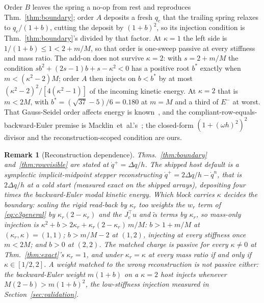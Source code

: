 \documentclass[sigconf,screen,review,anonymous]{acmart}
\newcommand{\Rr}{w_{r}}
\newcommand{\oh}{\omega h}
\theoremstyle{acmdefinition}
\newtheorem{remark}{Remark}
\begin{document}
Order $B$ leaves the spring a no-op from rest and reproduces
Thm.~\ref{thm:boundary}; order $A$ deposits a fresh $q_c$ that the trailing
spring relaxes to $q_c/(1+b)$, cutting the deposit by $(1+b)^2$, so its
injection condition is Thm.~\ref{thm:boundary}'s divided by that factor. At
$\kappa = 1$ the left side is $1/(1+b) \le 1 < 2 + m/M$, so that
order is one-sweep passive at every stiffness and mass ratio. The add-on does
not survive $\kappa = 2$: with $s = 2 + m/M$ the condition
$s b^2 + (2s - 1) b + s - \kappa^2 < 0$ has a positive root $b^{*}$
exactly when $m < (\kappa^2 - 2)M$; order $A$ then
injects on $b < b^{*}$ by at most $(\kappa^2 - 2)^2/[4(\kappa^2 - 1)]$ of the
incoming kinetic energy. At $\kappa = 2$ that is $m < 2M$, with
$b^{*} = (\sqrt{37} - 5)/6 = 0.180$ at $m = M$ and a third of $E^{-}$ at worst.
That Gauss-Seidel order affects energy is
known~\citep{arnold2010stability,cetinaslan2019energyaware}, and the
compliant-row-equals-backward-Euler premise is
Macklin~et~al.'s~\citep{macklin2016xpbd}; the closed-form $(1 + (\oh)^2)^2$
divisor and the reconstruction-scoped condition are ours.

\begin{remark}[Reconstruction dependence]
\label{rmk:recon}
Thms.~\ref{thm:boundary} and~\ref{thm:rowvisible} are stated at
$\dot q^{+} = \Delta q/h$. The shipped host default is a symplectic
implicit-midpoint stepper reconstructing $\dot q^{+} = 2\Delta q/h - \dot q^{n}$,
that is $2\Delta q/h$ at a cold start (measured exact on the shipped arrays),
depositing four times the backward-Euler modal kinetic
energy. Which block carries $\kappa$ decides the boundary: scaling the rigid
read-back by $\kappa_r$ too weights the $\Rr$ term of \eqref{eq:c3general}
by $\kappa_r(2 - \kappa_r)$ and the $J_c^{\top}u$ and $\tilde\alpha$ terms by
$\kappa_r$, so mass-only injection is
$\kappa^2 + b > 2\kappa_r + \kappa_r(2 - \kappa_r)\,m/M$:
$b > 1 + m/M$ at $(\kappa_r, \kappa) = (1,1)$; $b > m/M - 2$ at $(1,2)$,
injecting at \emph{every} stiffness once $m < 2M$; and $b > 0$ at $(2,2)$. The
matched charge is passive for every $\kappa \neq 0$ at Thm.~\ref{thm:exact}'s
$\kappa_r = 1$, and under $\kappa_r = \kappa$ at every mass ratio if and
only if $\kappa \in [1/2, 2]$. A weight
matched to the wrong reconstruction is not passive either: the backward-Euler
weight $m(1+b)$ on a $\kappa = 2$ host injects whenever $M(2 - b) > m(1+b)^2$,
the low-stiffness injection measured in Section~\ref{sec:validation}.
\end{remark}
\end{document}

